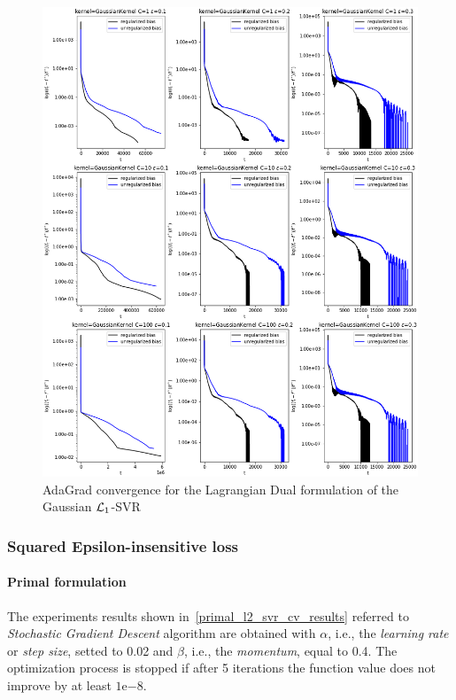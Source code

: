 \begin{figure}[H]
	\centering
	\includegraphics[scale=0.55]{img/gaussian_lagrangian_dual_l1_svr_loss_history}
	\caption{AdaGrad convergence for the Lagrangian Dual formulation of the Gaussian $\protect \mathcal{L}_1$-SVR}
	\label{fig:gaussian_lagrangian_dual_l1_svr_loss_history}
\end{figure}

\pagebreak

\subsubsection{Squared Epsilon-insensitive loss}

\paragraph{Primal formulation}

The experiments results shown in~\ref{primal_l2_svr_cv_results} referred to \emph{Stochastic Gradient Descent} algorithm are obtained with $\alpha$, i.e., the \emph{learning rate} or \emph{step size}, setted to 0.02 and $\beta$, i.e., the \emph{momentum}, equal to 0.4. The optimization process is stopped if after 5 iterations the function value does not improve by at least $1\mathrm{e}{-8}$.


